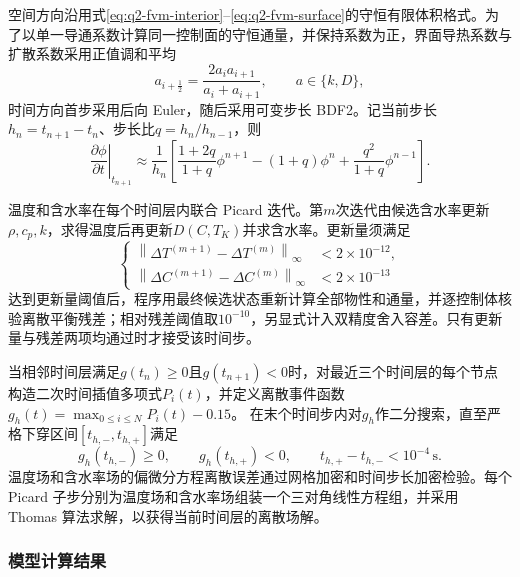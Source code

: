 \documentclass[withoutpreface,bwprint]{cumcmthesis}
\begin{document}
空间方向沿用式\eqref{eq:q2-fvm-interior}--\eqref{eq:q2-fvm-surface}的守恒有限体积格式。为了以单一导通系数计算同一控制面的守恒通量，并保持系数为正，界面导热系数与扩散系数采用正值调和平均
\begin{equation}
a_{i+\frac12}
=\frac{2a_i a_{i+1}}{a_i+a_{i+1}},
\qquad a\in\{k,D\},
\label{eq:q3-face-harmonic}
\end{equation}
时间方向首步采用后向 Euler，随后采用可变步长 BDF2。记当前步长$h_n=t_{n+1}-t_n$、步长比$q=h_n/h_{n-1}$，则
\begin{equation}
\left.\frac{\partial\phi}{\partial t}\right|_{t_{n+1}}
\approx\frac{1}{h_n}
\left[
\frac{1+2q}{1+q}\phi^{n+1}
-(1+q)\phi^n
+\frac{q^2}{1+q}\phi^{n-1}
\right].
\label{eq:q3-bdf2}
\end{equation}

温度和含水率在每个时间层内联合 Picard 迭代。第$m$次迭代由候选含水率更新$\rho,c_p,k$，求得温度后再更新$D(C,T_K)$并求含水率。更新量须满足
\begin{equation}
\left\{
\begin{aligned}
\left\|\Delta T^{(m+1)}-\Delta T^{(m)}\right\|_\infty
&<2\times10^{-12},\\
\left\|\Delta C^{(m+1)}-\Delta C^{(m)}\right\|_\infty
&<2\times10^{-13}
\end{aligned}
\right.
\label{eq:q3-picard-criterion}
\end{equation}
达到更新量阈值后，程序用最终候选状态重新计算全部物性和通量，并逐控制体核验离散平衡残差；相对残差阈值取$10^{-10}$，另显式计入双精度舍入容差。只有更新量与残差两项均通过时才接受该时间步。

当相邻时间层满足$g(t_n)\ge0$且$g(t_{n+1})<0$时，对最近三个时间层的每个节点构造二次时间插值多项式$P_i(t)$，并定义离散事件函数$g_h(t)=\max_{0\le i\le N}P_i(t)-0.15$。
在末个时间步内对$g_h$作二分搜索，直至严格下穿区间$[t_{h,-},t_{h,+}]$满足
\begin{equation}
g_h(t_{h,-})\ge0,
\qquad
g_h(t_{h,+})<0,
\qquad
t_{h,+}-t_{h,-}<10^{-4}\,\mathrm s.
\label{eq:q3-event-bracket}
\end{equation}
温度场和含水率场的偏微分方程离散误差通过网格加密和时间步长加密检验。每个 Picard 子步分别为温度场和含水率场组装一个三对角线性方程组，并采用 Thomas 算法求解，以获得当前时间层的离散场解。



\subsubsection{模型计算结果}
\end{document}
